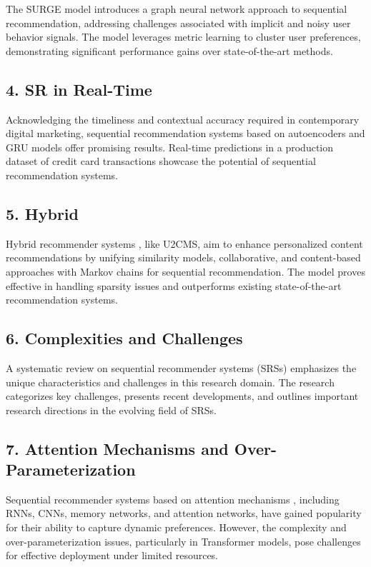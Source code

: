 \documentclass[journal]{IEEEtran}
\begin{document}
The SURGE model \cite{10.1145/3404835.3462968} introduces a graph neural network approach to sequential recommendation, addressing challenges associated with 
implicit and noisy user behavior signals. The model leverages metric learning to cluster user preferences, demonstrating significant 
performance gains over state-of-the-art methods.

\subsection*{4. SR in Real-Time}

Acknowledging the timeliness and contextual accuracy required in contemporary digital marketing, sequential recommendation systems 
based on autoencoders and GRU models offer promising results. Real-time predictions \cite{SRMNPP} in a production dataset of credit card transactions 
showcase the potential of sequential recommendation systems.

\subsection*{5. Hybrid}

Hybrid recommender systems \cite{SRMNPP,9207880}, like U2CMS, aim to enhance personalized content recommendations by unifying similarity models, 
collaborative, and content-based approaches with Markov chains for sequential recommendation. The model proves effective in handling 
sparsity issues and outperforms existing state-of-the-art recommendation systems.

\subsection*{6. Complexities and Challenges}

A systematic review on sequential recommender systems (SRSs) emphasizes the unique characteristics and challenges \cite{Wang_2019} in this research 
domain. The research categorizes key challenges, presents recent developments, and outlines important research directions in the 
evolving field of SRSs.

\subsection*{7. Attention Mechanisms and Over-Parameterization}

Sequential recommender systems based on attention mechanisms \cite{9123874}, including RNNs, CNNs, memory networks, and attention networks, have 
gained popularity for their ability to capture dynamic preferences. However, the complexity and over-parameterization issues, 
particularly in Transformer models, pose challenges for effective deployment under limited resources.
\end{document}
